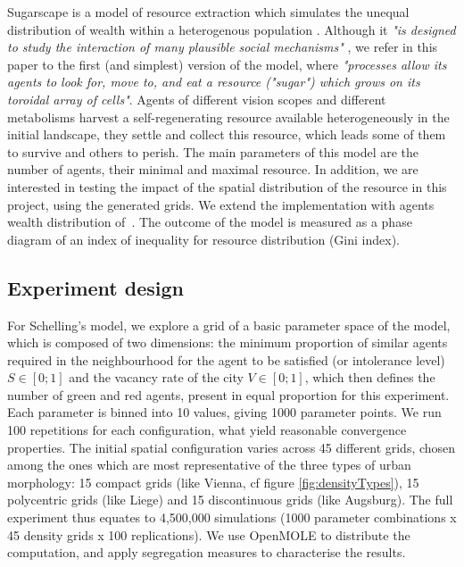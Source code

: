\documentclass[Royal,sageh,times]{sagej}
\begin{document}
Sugarscape is a model of resource extraction which simulates the unequal distribution of wealth within a heterogenous population \citep{EpsteinAxtell1996}. Although it {\it "is designed to study the interaction of many plausible social mechanisms"} \citep[p.125]{Axtelletal1996}, we refer in this paper to the first (and simplest) version of the model, where {\it "processes allow its agents to look for, move to, and eat a resource ("sugar") which grows on its toroidal array of cells"}. Agents of different vision scopes and different metabolisms harvest a self-regenerating resource available heterogeneously in the initial landscape, they settle and collect this resource, which leads some of them to survive and others to perish. The main parameters of this model are the number of agents, their minimal and maximal resource. In addition, we are interested in testing the impact of the spatial distribution of the resource in this project, using the generated grids. We extend the implementation with agents wealth distribution of~\citet{li2009netlogo}. The outcome of the model is measured as a phase diagram of an index of inequality for resource distribution (Gini index). 


\subsection{Experiment design}
For Schelling's model, we explore a grid of a basic parameter space of the model, which is composed of two dimensions: the minimum proportion of similar agents required in the neighbourhood for the agent to be satisfied (or intolerance level) $S\in \left[0;1\right]$ and the vacancy rate of the city $V\in \left[0;1\right]$, which then defines the number of green and red agents, present in equal proportion for this experiment. Each parameter is binned into 10 values, giving 1000 parameter points. 
We run 100 repetitions for each configuration, what yield reasonable convergence properties. The initial spatial configuration varies across 45 different grids, chosen among the ones which are most representative of the three types of urban morphology: 15 compact grids (like Vienna, cf figure \ref{fig:densityTypes}), 15 polycentric grids (like Liege) and 15 discontinuous grids (like Augsburg). The full experiment thus equates to 4,500,000 simulations (1000 parameter combinations x 45 density grids x 100 replications). We use OpenMOLE to distribute the computation, and apply segregation measures to characterise the results. 
\end{document}
